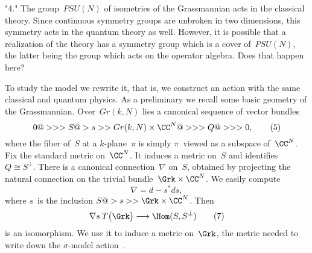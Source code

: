  \item"4." The group~$PSU(N)$ of isometries of the Grassmannian acts in the
classical theory.  Since continuous symmetry groups are unbroken in two
dimensions, this symmetry acts in the quantum theory as well.  However, it is
possible that a realization of the theory has a symmetry group which is a
cover of~$PSU(N)$, the latter being the group which acts on the operator
algebra.  Does that happen here?
 \endroster


To study the model we rewrite it, that is, we construct an action with the
same classical and quantum physics.  As a preliminary we recall some basic
geometry of the Grassmannian.  Over~$Gr(k,N)$ lies a canonical sequence of
vector bundles
  $$ 0 @>>> S @>s>> Gr(k,N)\times \CC^N @>>> Q @>>> 0,  \tag{5} $$
where the fiber of~$S$ at a $k$-plane~$\pi $ is simply $\pi $~viewed as a
subspace of~$\CC^N$.  Fix the standard metric on~$\CC^N$. It induces a metric
on~$S$ and identifies~$Q\cong S^\perp$.  There is a canonical
connection~$\nabla $ on~$S$, obtained by projecting the natural connection on
the trivial bundle~$\Grk\times \CC^N$.  We easily compute
  $$ \nabla =d-s^*ds, \tag{6} $$
where $s$~is the inclusion $S@>s>>\Grk\times \CC^N$.  Then 
  $$ \nabla s\:T\bigl(\Grk\bigr)\longrightarrow \Hom(S,S^\perp) \tag{7} $$
is an isomorphism.  We use it to induce a metric on~$\Grk$, the metric needed
to write down the $\sigma $-model action~. 
 

